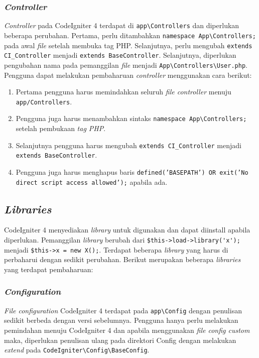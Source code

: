 \subsubsection{\textit{Controller}}
\textit{Controller} pada CodeIgniter 4 terdapat di \verb|app\Controllers| dan diperlukan beberapa perubahan. Pertama, perlu ditambahkan \verb|namespace App\Controllers;| pada awal \textit{file} setelah membuka tag PHP. Selanjutnya, perlu mengubah \verb|extends CI_Controller| menjadi \verb|extends BaseController|. Selanjutnya, diperlukan pengubahan nama pada pemanggilan \textit{file} menjadi \verb|App\Controllers\User.php|. Pengguna dapat melakukan pembaharuan \textit{controller} menggunakan cara berikut:
\begin{enumerate}
\item Pertama pengguna harus memindahkan seluruh \textit{file controller} menuju \verb|app/Controllers|.
\item Pengguna juga harus menambahkan sintaks \verb|namespace App\Controllers;| setelah pembukaan \textit{tag PHP}.
\item Selanjutnya pengguna harus mengubah \verb|extends CI_Controller| menjadi \verb|extends BaseController|.
\item Pengguna juga harus menghapus baris \texttt{defined('BASEPATH') OR exit('No direct script access allowed');} apabila ada.
\end{enumerate}
 
\subsection{\textit{Libraries}}
 
CodeIgniter 4 menyediakan \textit{library} untuk digunakan dan dapat diinstall apabila diperlukan. Pemanggilan \textit{library} berubah dari \verb|$this->load->library('x');| menjadi \verb|$this->x = new X();|. Terdapat beberapa \textit{library} yang harus di perbaharui dengan sedikit perubahan. Berikut merupakan beberapa \textit{libraries} yang terdapat pembaharuan:
\subsubsection{\textit{Configuration}}

\textit{File configuration} CodeIgniter 4 terdapat pada \verb|app\Config| dengan penulisan sedikit berbeda dengan versi sebelumnya. Pengguna hanya perlu melakukan pemindahan menuju CodeIgniter 4 dan apabila menggunakan \textit{file config custom} maka, diperlukan penulisan ulang pada direktori Config dengan melakukan \textit{extend} pada \verb|CodeIgniter\Config\BaseConfig|.   

